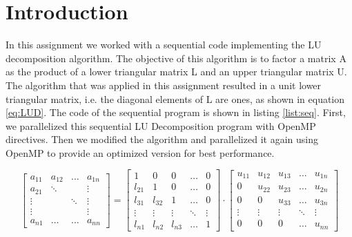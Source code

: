 \documentclass[a4paper,oneside,12pt,titlepage,parskip=true]{scrartcl}   %
\begin{document}
\maketitle  %

\thispagestyle{empty}

\newpage

\pagestyle{plain}


\section{Introduction}
In this assignment we worked with a sequential code implementing the LU decomposition algorithm.
The objective of this algorithm is to factor a matrix A as the product of a lower triangular matrix L and an upper triangular matrix U.
The algorithm that was applied in this assignment resulted in a unit lower triangular matrix,
i.e. the diagonal elements of L are ones, as shown in equation \ref{eq:LUD}.
The code of the sequential program is shown in listing \ref{list:seq}.
First, we parallelized this sequential LU Decomposition program with OpenMP directives.
Then we modified the algorithm and parallelized it again using OpenMP to provide an optimized version for best performance.

\begin{equation}
\begin{bmatrix}
a_{11} & a_{12} &  \dots & a_{1n}\\
a_{21} & \ddots		&		& \vdots\\
\vdots	& 			& \ddots 	& \vdots\\
\vdots	&			&			& \vdots\\
a_{n1} & \dots		& \dots		 & a_{nn}
\end{bmatrix}
=
\begin{bmatrix}
1		&	0	& 0 	& \dots & 0\\
l_{21} 	& 	1 	& 0 	& \dots & 0\\
l_{31} & l_{32} & 1 	& \dots & 0\\
\vdots	& \vdots& \vdots& \ddots & \vdots\\
l_{n1} & l_{n2} & l_{n3} & \dots & 1
\end{bmatrix}
\cdot
\begin{bmatrix}
u_{11}	& u_{12} & u_{13} & \dots & u_{1n}\\
0		& u_{22} & u_{23} & \dots & u_{2n}\\
0		& 0		& u_{33}  & \dots & u_{3n}\\
\vdots & \vdots & \vdots & \ddots & \vdots\\
0 		& 0		& 0 	& \dots	 & u_{nn}
\end{bmatrix}
\label{eq:LUD}
\end{equation}
\end{document}
